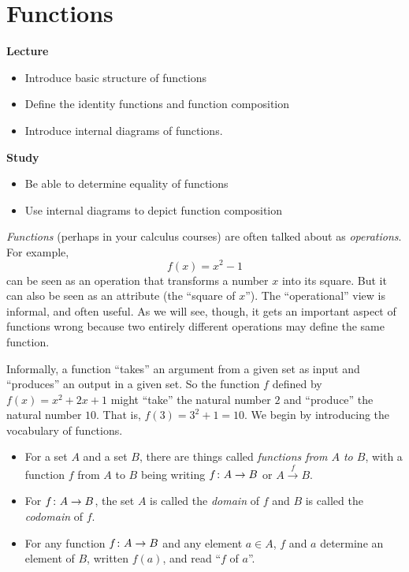 \chapter{Functions}

\begin{goals}
\noindent\textbf{Lecture}
\begin{itemize}
\item Introduce basic structure of functions
\item Define the identity functions and function composition
\item Introduce internal diagrams of functions.
\end{itemize}

\noindent\textbf{Study}
\begin{itemize}
\item Be able to determine equality of functions
\item Use internal diagrams to depict function composition
\end{itemize}
\end{goals}

\emph{Functions} (perhaps in your calculus courses) are often talked about as \emph{operations}. 
For example, 
\[f(x) = x^2-1\]
can be seen as an operation that transforms a number $x$ into its square.
But it can also be seen as an attribute (the ``square of $x$'').
The ``operational'' view is informal, and often useful.
As we will see, though, it gets an important aspect of functions wrong because two entirely different operations may define the same function.

Informally, a function ``takes'' an argument from a given set as input and ``produces'' an output in a given set.
So the function $f$ defined by $f(x)=x^2 + 2x + 1$ might ``take'' the natural number $2$ and ``produce'' the natural number $10$. 
That is, $f(3)=3^2 + 1 = 10$. 
We begin by introducing the vocabulary of functions.

\begin{signature}
	\begin{itemize}
	\item For a set $A$ and a set $B$, there are things called \emph{functions from $A$ to $B$}, with a function $f$ from $A$ to $B$ being writing ${f}\colon{A}\to{B}$ or $A\stackrel{f}{\to} B$. 

	\item For ${f}\colon{A}\to{B}$, the set $A$ is called the \emph{domain} of $f$ and $B$ is called the \emph{codomain} of $f$.
	
	\item For any function ${f}\colon{A}\to{B}$ and any element $a\in A$, $f$ and $a$ determine an element of $B$, written $f(a)$, and read ``$f$ of $a$''.
	\end{itemize}
\end{signature}


